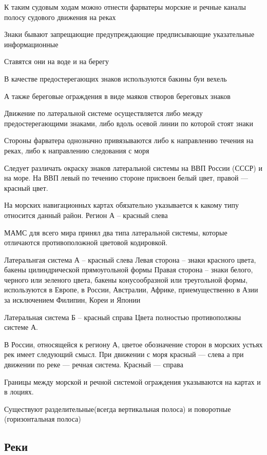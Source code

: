 \documentclass{article}        %
\begin{document}
К таким судовым ходам можно отнести 
	фарватеры
	морские и речные каналы
	полосу судового движения на реках


Знаки бывают
	запрещающие
	предупреждающие
	предписывающие
	указательные
	информационные

Ставятся они на воде и на берегу

В качестве предостерегающих знаков используются
	бакины
	буи
	вехель

А также береговые ограждения в виде
	маяков
	створов
	береговых знаков

Движение по латеральной системе осуществляется либо между предостерегающими знаками, 
либо вдоль осевой линии по которой стоят знаки

Стороны фарватера однозначно привязываются либо к направлению течения на реках, либо к направлению следования с моря


Следует различать окраску знаков латеральной системы на ВВП России (СССР) и на море.
На ВВП левый по течению стороне присвоен белый цвет, правой --- красный цвет.

На морских навигационных картах обязательно указывается к какому типу относится данный район.
Регион А -- красный слева

МАМС для всего мира принял два типа латеральной системы, 
которые отличаются противоположной цветовой кодировкой.

Латеральнгая система А -- красный слева
Левая сторона -- знаки красного цвета, бакены цилиндрической прямоугольной формы
Правая сторона -- знаки белого, черного или зеленого цвета, бакены конусообразной или треугольной формы, используются в Европе, в России, Австралии, Африке, приемущественно в Азии за исключением Филипин, Кореи и Японии


Латеральная система Б -- красный справа
Цвета полностью противополжны системе А.

В России, относящейся к региону А, цветое обозначение сторон в морских устьях рек 
имеет следующий смысл. При движении с моря красный --- слева
а при движении по реке --- речная система. Красный --- справа

Границы между морской и речной системой ограждения указываются на картах и в лоциях.

Существуют разделительные(всегда вертикальная полоса) и поворотные (горизонтальная полоса)


\subsection{Реки}
\end{document}
